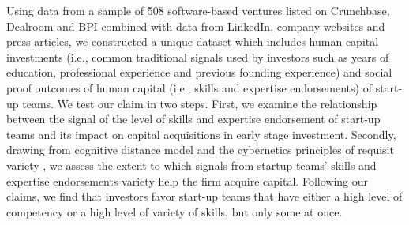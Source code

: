 \documentclass[12pt]{article}
\begin{document}
Using data from a sample of 508 software-based ventures listed on Crunchbase, Dealroom and BPI combined with data from LinkedIn, company websites and press articles, we constructed a unique dataset which includes human capital investments (i.e., common traditional signals used by investors such as years of education, professional experience and previous founding experience) and social proof outcomes of human capital (i.e., skills and expertise endorsements) of start-up teams. We test our claim in two steps. First, we examine the relationship between the signal of the level of skills and expertise endorsement of start-up teams and its impact on capital acquisitions in early stage investment. Secondly, drawing from cognitive distance model \citep{nooteboom2007optimal} and the cybernetics principles of requisit variety \citep{ashby1957introduction}, we assess the extent to which signals from startup-teams' skills and expertise endorsements variety help the firm acquire capital. Following our claims, we find that investors favor start-up teams that have either a high level of competency or a high level of variety of skills, but only some at once.
\end{document}
